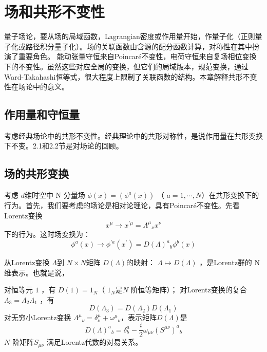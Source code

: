 \chapter{场和共形不变性}

量子场论，要从场的局域函数，Lagrangian密度或作用量开始，作量子化（正则量子化或路径积分量子化）。场的关联函数由含源的配分函数计算，对称性在其中扮演了重要角色。 能动张量守恒来自Poincaré不变性，电荷守恒来自复场相位变换下的不变性。虽然这些对应全局的变换，但它们的局域版本，规范变换，通过Ward-Takahashi恒等式，很大程度上限制了关联函数的结构。本章解释共形不变性在场论中的意义。

\section{作用量和守恒量}
考虑经典场论中的共形不变性。经典理论中的共形对称性，是说作用量在共形变换下不变。2.1和2.2节是对场论的回顾。
\section{场的共形变换}
考虑 $d $维时空中 N 分量场 $\phi(x)=\left(\phi^{a}(x)\right)$ （ $a=1,\cdots,N $）在共形变换下的行为。首先，我们要考虑的场论是相对论理论，具有Poincaré不变性。先看Lorentz变换
\begin{equation}
	x^{\mu} \rightarrow x^{\prime \mu}=\Lambda^{\mu} {}_{\nu}x^{\nu}
\end{equation}
下的行为。这时场变换为：
\begin{equation}
	\phi^{a}(x) \rightarrow \phi^{\prime a}\left(x^{\prime}\right)=D(\Lambda)^{a}{ }_{b} \phi^{b}(x)
\end{equation}

从Lorentz变换 $\Lambda $到 $N\times N $矩阵 $D(\Lambda) $的映射： $\Lambda \mapsto D(\Lambda)$ ，是Lorentz群的 N 维表示。也就是说，

对恒等元 $1$ ，有 $D(1)=1_N $（ $1_N $是$ N$ 阶恒等矩阵）；
对Lorentz变换的复合 $\Lambda_3=\Lambda_2\Lambda_1$ ，有
\begin{equation}
	D\left(\Lambda_{3}\right)=D\left(\Lambda_{2}\right) D\left(\Lambda_{1}\right)
\end{equation}
对无穷小Lorentz变换 $\Lambda^{\mu}{}_{\nu}=\delta_{\nu}^{\mu}+\omega^{\mu}{}_{\nu} $，表示矩阵$ D(\Lambda) $是
\begin{equation}
	D(\Lambda)^{a}{}_{b}=\delta_{b}^{a}-\frac{i}{2} \omega_{\mu \nu}\left(S^{\mu \nu}\right)^{a}{}_{b}
\end{equation}
$N$ 阶矩阵$ S_{\mu \nu}$ 满足Lorentz代数的对易关系。

